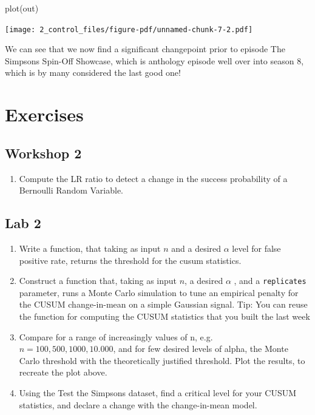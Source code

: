 \documentclass[
  letterpaper,
  DIV=11,
  numbers=noendperiod]{scrreprt}
\newenvironment{Shaded}{\begin{snugshade}}{\end{snugshade}}
\newcommand{\FunctionTok}[1]{\textcolor[rgb]{0.28,0.35,0.67}{#1}}
\newcommand{\NormalTok}[1]{\textcolor[rgb]{0.00,0.23,0.31}{#1}}
\providecommand{\tightlist}{%
  \setlength{\itemsep}{0pt}\setlength{\parskip}{0pt}}\usepackage{longtable,booktabs,array}
\begin{document}
\begin{Shaded}
\begin{Highlighting}[]
\FunctionTok{plot}\NormalTok{(out)}
\end{Highlighting}
\end{Shaded}

\texttt{[image: 2\_control\_files/figure-pdf/unnamed-chunk-7-2.pdf]}

We can see that we now find a significant changepoint prior to episode
The Simpsons Spin-Off Showcase, which is anthology episode well over
into season 8, which is by many considered the last good one!

\section{Exercises}\label{exercises-1}

\subsection{Workshop 2}\label{workshop-2}

\begin{enumerate}
\def\labelenumi{\arabic{enumi}.}
\tightlist
\item
  Compute the LR ratio to detect a change in the success probability of
  a Bernoulli Random Variable.
\end{enumerate}

\subsection{Lab 2}\label{lab-2}

\begin{enumerate}
\def\labelenumi{\arabic{enumi}.}
\item
  Write a function, that taking as input \(n\) and a desired \(\alpha\)
  level for false positive rate, returns the threshold for the cusum
  statistics.
\item
  Construct a function that, taking as input \(n\), a desired \(\alpha\)
  , and a \texttt{replicates} parameter, runs a Monte Carlo simulation
  to tune an empirical penalty for the CUSUM change-in-mean on a simple
  Gaussian signal. Tip: You can reuse the function for computing the
  CUSUM statistics that you built the last week
\item
  Compare for a range of increasingly values of n,
  e.g.~\(n = 100, 500, 1000, 10.000\), and for few desired levels of
  alpha, the Monte Carlo threshold with the theoretically justified
  threshold. Plot the results, to recreate the plot above.
\item
  Using the Test the Simpsons dataset, find a critical level for your
  CUSUM statistics, and declare a change with the change-in-mean model.
\end{enumerate}
\end{document}

